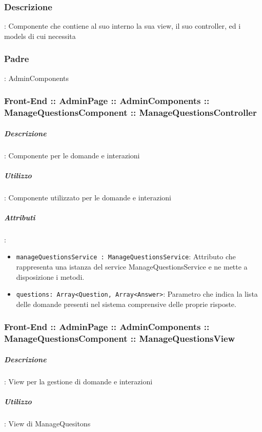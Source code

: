 \documentclass[../ManualeSviluppatore_v2.0.0.tex]{subfiles}
\begin{document}
			\subsubsection{Descrizione}: Componente che contiene al suo interno la sua view, il suo controller, ed i models di cui necessita
			\subsubsection{Padre}: AdminComponents
			      \subsubsection{Front-End :: AdminPage :: AdminComponents :: ManageQuestionsComponent :: ManageQuestionsController}
			      	\subparagraph{Descrizione}: Componente per le domande e interazioni
			      	\subparagraph{Utilizzo}: Componente utilizzato per le domande e interazioni
			      	\subparagraph{Attributi}:
      	      			\begin{itemize}
							\item \texttt{manageQuestionsService : ManageQuestionsService}: Attributo che rappresenta una istanza del service ManageQuestionsService e ne mette a disposizione i metodi.
							\item \texttt{questions: Array<Question, Array<Answer>}: Parametro che indica la lista delle domande presenti nel sistema comprensive delle proprie risposte.
						\end{itemize}
					\subsubsection{Front-End :: AdminPage :: AdminComponents :: ManageQuestionsComponent :: ManageQuestionsView}
						\subparagraph{Descrizione}: View per la gestione di domande e interazioni
						\subparagraph{Utilizzo}: View di ManageQuesitons

	\newpage
\end{document}
